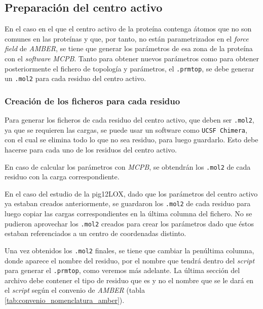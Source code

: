     \subsection{Preparación del centro activo}
        En el caso en el que el centro activo de la proteína contenga átomos que no son comunes en las proteínas y que, por tanto, no están parametrizados en el \textit{force field} de \textit{AMBER}, se tiene que generar los parámetros de esa zona de la proteína con el \textit{software MCPB}. Tanto para obtener nuevos parámetros como para obtener posteriormente el fichero de topología y parámetros, el \texttt{.prmtop}, se debe generar un \texttt{.mol2} para cada residuo del centro activo.\par
        
        
        \subsubsection{Creación de los ficheros para cada residuo}
            Para generar los ficheros de cada residuo del centro activo, que deben ser \texttt{.mol2}, ya que se requieren las cargas, se puede usar un software como \texttt{UCSF Chimera}, con el cual se elimina todo lo que no sea residuo, para luego guardarlo. Esto debe hacerse para cada uno de los residuos del centro activo.\par
            
            En caso de calcular los parámetros con \textit{MCPB}, se obtendrán los \texttt{.mol2} de cada residuo con la carga correspondiente.\par
            
            \textsf{En el caso del estudio de la pig12LOX, dado que los parámetros del centro activo ya estaban creados anteriormente, se guardaron los \texttt{.mol2} de cada residuo para luego copiar las cargas correspondientes en la última columna del fichero. No se pudieron aprovechar los \texttt{.mol2} creados para crear los parámetros dado que éstos estaban referenciados a un centro de coordenadas distinto.}\par
            
            Una vez obtenidos los \texttt{.mol2} finales, se tiene que cambiar la penúltima columna, donde aparece el nombre del residuo, por el nombre que tendrá dentro del \textit{script} para generar el \texttt{.prmtop}, como veremos más adelante. La última sección del archivo debe contener el tipo de residuo que es y no el nombre que se le dará en el \textit{script} según el convenio de \textit{AMBER} (tabla \ref{tab:convenio_nomenclatura_amber}).
        
